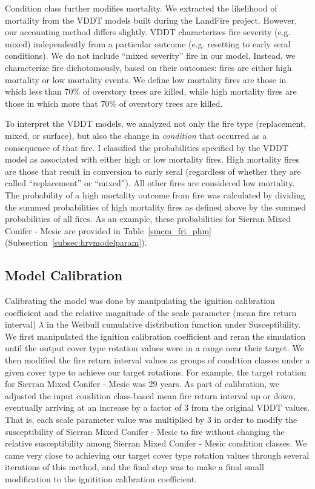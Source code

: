 \begin{itemize}
Condition class further modifies mortality. We extracted the likelihood of mortality from the VDDT models built during the LandFire project. However, our accounting method differs slightly. VDDT characterizes fire severity (e.g. mixed) independently from a particular outcome (e.g. resetting to early seral conditions). We do not include ``mixed severity'' fire in our model. Instead, we characterize fire dichotomously, based on their outcomes: fires are either high mortality or low mortality events. We define low mortality fires are those in which less than 70\% of overstory trees are killed, while high mortality fires are those in which more that 70\% of overstory trees are killed. 

To interpret the VDDT models, we analyzed not only the fire type (replacement, mixed, or surface), but also the change in \emph{condition} that occurred as a consequence of that fire. I classified the probabilities specified by the VDDT model as associated with either high or low mortality fires. High mortality fires are those that result in conversion to early seral (regardless of whether they are called ``replacement'' or ``mixed''). All other fires are considered low mortality. The probability of a high mortality outcome from fire was calculated by dividing the summed probabilities of high mortality fires as defined above by the summed probabilities of all fires. As an example, these probabilities for Sierran Mixed Conifer - Mesic are provided in Table~\ref{smcm_fri_phm} (Subsection~\ref{subsec:hrvmodelparam}).

\end{itemize}

\subsection{Model Calibration}
Calibrating the model was done by manipulating the ignition calibration coefficient and the relative magnitude of the scale parameter (mean fire return interval) $\lambda$ in the Weibull cumulative distribution function under Susceptibility. We first manipulated the ignition calibration coefficient and reran the simulation until the output cover type rotation values were in a range near their target. We then modified the fire return interval values as groups of condition classes under a given cover type to achieve our target rotations. For example, the target rotation for Sierran Mixed Conifer - Mesic was 29 years. As part of calibration, we adjusted the input condition class-based mean fire return interval up or down, eventually arriving at an increase by a factor of 3 from the original VDDT values. That is, each scale parameter value was multiplied by 3 in order to modify the susceptibility of Sierran Mixed Conifer - Mesic to fire without changing the relative susceptibility among Sierran Mixed Conifer - Mesic condition classes. We came very close to achieving our target cover type rotation values through several iterations of this method, and the final step was to make a final small modification to the ignitition calibration coefficient.

